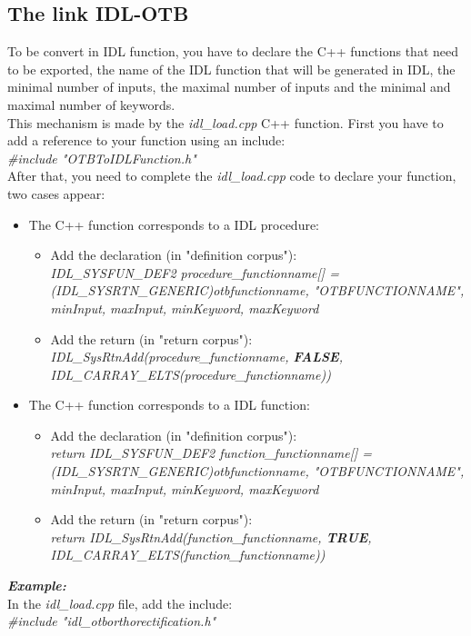 \subsection{The link IDL-OTB}
To be convert in IDL function, you have to declare the C++ functions that need to be exported, the name of the IDL function 
that will be generated in IDL, the minimal number of inputs, the maximal number of inputs and the minimal and maximal number of keywords. \\
This mechanism is made by the \emph{idl\_load.cpp} C++ function.
First you have to add a reference to your function using an include:\\
\emph{\#include "OTBToIDLFunction.h"}
\\
After that, you need to complete the \emph{idl\_load.cpp} code to declare your function, two cases appear:
\begin{itemize}
\item The C++ function corresponds to a IDL procedure:
  \begin{itemize}
  \item Add the declaration (in "definition corpus"):\\
    \emph{IDL\_SYSFUN\_DEF2 procedure\_functionname[] = {{ (IDL\_SYSRTN\_GENERIC)otbfunctionname, "OTBFUNCTIONNAME", minInput, maxInput, minKeyword, maxKeyword}}}
  \item Add the return (in "return corpus"):\\
    \emph{IDL\_SysRtnAdd(procedure\_functionname, \textbf{FALSE}, IDL\_CARRAY\_ELTS(procedure\_functionname))}
  \end{itemize}
\item The C++ function corresponds to a IDL function:
  \begin{itemize}
  \item Add the declaration (in "definition corpus"):\\
    \emph{return IDL\_SYSFUN\_DEF2 function\_functionname[] = {{ (IDL\_SYSRTN\_GENERIC)otbfunctionname, "OTBFUNCTIONNAME", minInput, maxInput, minKeyword, maxKeyword}}}
  \item Add the return (in "return corpus"):\\
    \emph{return IDL\_SysRtnAdd(function\_functionname, \textbf{TRUE}, IDL\_CARRAY\_ELTS(function\_functionname))}
  \end{itemize}
\end{itemize}

\emph{\textbf{Example:}}\\
\indent In the \emph{idl\_load.cpp} file, add the include:\\
\indent \emph{\#include "idl\_otborthorectification.h"}\\

